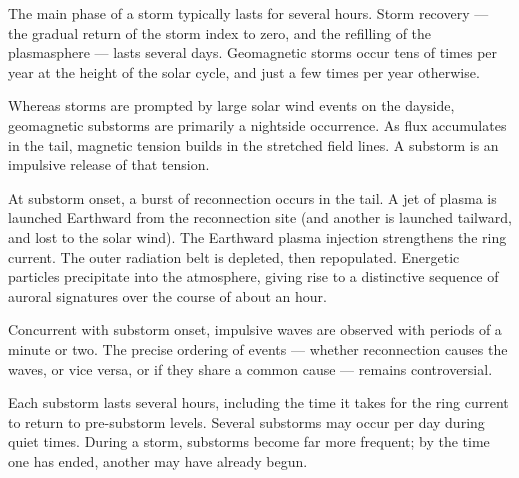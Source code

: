 The main phase of a storm typically lasts for several hours. Storm recovery ---
the gradual return of the storm index to zero, and the refilling of the
plasmasphere --- lasts several days. Geomagnetic storms occur tens of times per
year at the height of the solar cycle, and just a few times per year otherwise. 

Whereas storms are prompted by large solar wind events on the dayside,
geomagnetic substorms are primarily a nightside occurrence. As flux accumulates
in the tail, magnetic tension builds in the stretched field lines. A substorm
is an impulsive release of that tension. 


At substorm onset, a burst of reconnection occurs in the tail. A jet of plasma
is launched Earthward from the reconnection site (and another is launched
tailward, and lost to the solar wind). The Earthward plasma injection
strengthens the ring current. The outer radiation belt is depleted, then
repopulated. Energetic particles precipitate into the atmosphere, giving rise
to a distinctive sequence of auroral signatures over the course of about an
hour. 

Concurrent with substorm onset, impulsive \Alfven waves are observed with
periods of a minute or two. The precise ordering of events --- whether
reconnection causes the waves, or vice versa, or if they share a common cause
--- remains controversial. 

Each substorm lasts several hours, including the time it takes for the ring
current to return to pre-substorm levels. Several substorms may occur per day
during quiet times. During a storm, substorms become far more frequent; by the
time one has ended, another may have already begun. 






